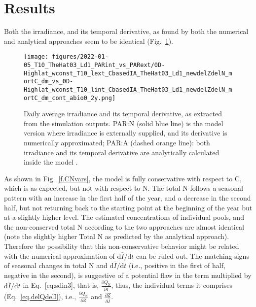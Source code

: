 \documentclass[gmd, manuscript]{copernicus}
\begin{document}




\section{Results}
Both the irradiance, and its temporal derivative, as found by both the numerical and analytical approaches seem to be identical (Fig.~\ref{f.I}).
\begin{figure}[ht!]
\texttt{[image: figures/2022-01-05\_T10\_TheHat03\_Ld1\_PARint\_vs\_PARext/0D-Highlat\_wconst\_T10\_lext\_CbasedIA\_TheHat03\_Ld1\_newdelZdelN\_mortC\_dm\_vs\_0D-Highlat\_wconst\_T10\_lint\_CbasedIA\_TheHat03\_Ld1\_newdelZdelN\_mortC\_dm\_cont\_abio0\_2y.png]}
\caption{Daily average irradiance and its temporal derivative, as extracted from the simulation outputs. PAR:N (solid blue line) is the model version where irradiance is externally supplied, and its derivative is numerically approximated; PAR:A (dashed orange line): both irradiance and its temporal derivative are analytically calculated inside the model . \label{f.I}}
\end{figure}

As shown in Fig.~\ref{f.CNvars}, the model is fully conservative with respect to C, which is as expected, but not with respect to N. The total N follows a seasonal pattern with an increase in the first half of the year, and a decrease in the second half, but not returning back to the starting point at the beginning of the year but at a slightly higher level. The estimated concentrations of individual pools, and the non-conserved total N according to the two approaches are almost identical (note the slightly higher Total N as predicted by the analytical approach). Therefore the possibility that this non-conservative behavior might be related with the numerical approximation of $\text{d}\bar{I}/\text{d}t$  can be ruled out. The matching signs of seasonal changes in total N and $\text{d}\bar{I}/\text{d}t$  (i.e., positive in the first of half, negative in the second), is suggestive of a potential flaw in the term multiplied by $\text{d}\bar{I}/\text{d}t$ in Eq.~\ref{eq:sdin3}, that is,  $\frac{\partial Q_{\text{N}}}{\partial \bar{I}}$, thus, the individual terms it comprises (Eq.~\ref{eq.delQdelI}), i.e., $\frac{\partial Q_{\text{N}}}{\partial Z}$ and $\frac{\partial Z}{\partial \bar{I}}$. 
\end{document}
